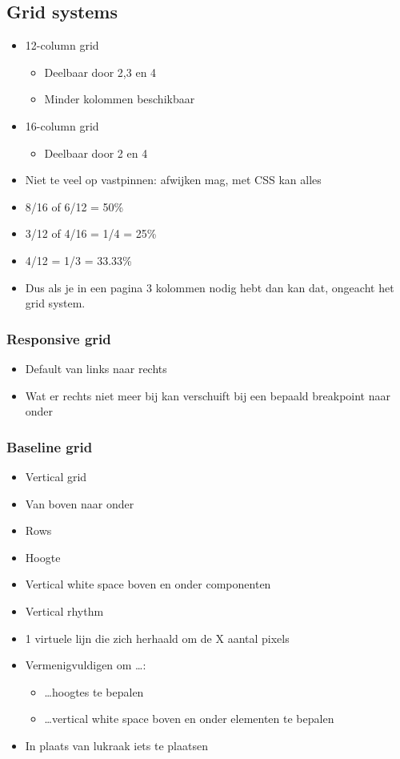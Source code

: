 \documentclass{article}
\begin{document}
\subsection{Grid systems}
\begin{itemize}
    \item 12-column grid
    \begin{itemize}
        \item Deelbaar door 2,3 en 4
        \item Minder kolommen beschikbaar
    \end{itemize}
    \item 16-column grid
    \begin{itemize}
        \item Deelbaar door 2 en 4
    \end{itemize}
    \item Niet te veel op vastpinnen: afwijken mag, met CSS kan alles
    \item 8/16 of 6/12 = 50\%
    \item 3/12 of 4/16 = 1/4 = 25\%
    \item 4/12 = 1/3 = 33.33\%
    \item Dus als je in een pagina 3 kolommen nodig hebt dan kan dat, ongeacht het grid system.
\end{itemize}


\subsubsection{Responsive grid}
\begin{itemize}
    \item Default van links naar rechts
    \item Wat er rechts niet meer bij kan verschuift bij een bepaald breakpoint naar onder
\end{itemize}

\subsubsection{Baseline grid}
\begin{itemize}
    \item Vertical grid
    \item Van boven naar onder
    \item Rows
    \item Hoogte
    \item Vertical white space boven en onder componenten
    \item Vertical rhythm
    \item 1 virtuele lijn die zich herhaald om de X aantal pixels
    \item Vermenigvuldigen om \dots:
    \begin{itemize}
        \item \dots hoogtes te bepalen
        \item \dots vertical white space boven en onder elementen te bepalen
    \end{itemize}
    \item In plaats van lukraak iets te plaatsen
\end{itemize}
\end{document}
